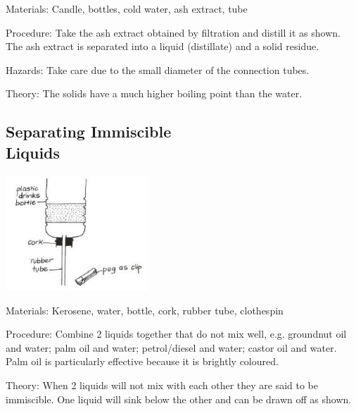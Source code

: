 \begin{multicols}{2}
\begin{description*}
\item[Materials:]{Candle, bottles, cold water, ash extract, tube}
\item[Procedure:]{Take the ash extract obtained by filtration and distill it as shown. The
ash extract is separated into a liquid (distillate)
and a solid residue.}
\item[Hazards:]{Take care due to the small diameter of the
connection tubes.}
\item[Theory:]{The solids have a much higher boiling point
than the water.}
\end{description*}

\subsection{Separating Immiscible \hfill \\ Liquids} %

\begin{center}
\includegraphics[width=0.4\textwidth]{./img/vso/sep-immiscible.jpg}
\end{center}

\begin{description*}
\item[Materials:]{Kerosene, water, bottle, cork, rubber tube, clothespin}
\item[Procedure:]{Combine 2 liquids together that do not mix well, e.g. groundnut oil and water; palm oil
and water; petrol/diesel and
water; castor oil and water. Palm
oil is particularly effective because
it is brightly coloured.}
\item[Theory:]{When 2 liquids will not mix with
each other they are said to be
immiscible. One liquid will sink
below the other and can be
drawn off as shown.}
\end{description*}


\end{multicols}
